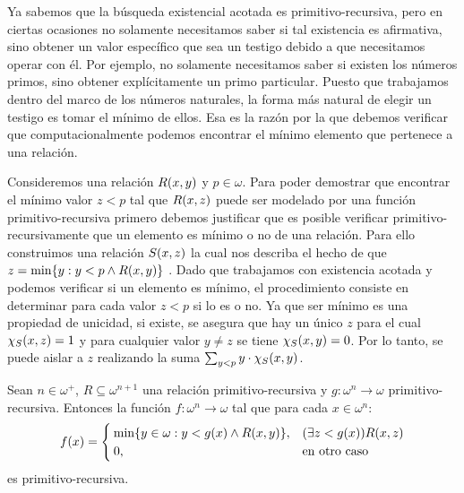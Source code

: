 Ya sabemos que la búsqueda existencial acotada es primitivo-recursiva, pero en ciertas ocasiones no solamente necesitamos saber si tal existencia es afirmativa, sino obtener un valor específico que sea un testigo debido a que necesitamos operar con él. Por ejemplo, no solamente necesitamos saber si existen los números primos, sino obtener explícitamente un primo particular. Puesto que trabajamos dentro del marco de los números naturales, la forma más natural de elegir un testigo es tomar el mínimo de ellos. Esa es la razón por la que debemos verificar que computacionalmente podemos encontrar el mínimo elemento que pertenece a una relación.

Consideremos una relación $R\pa*{x, y}$ y $p\in\omega$. Para poder demostrar que encontrar el mínimo valor $z < p$ tal que $R\pa*{x, z}$ puede ser modelado por una función primitivo-recursiva primero debemos justificar que es posible verificar primitivo-recursivamente que un elemento es mínimo o no de una relación. Para ello construimos una relación $S\pa*{x, z}$ la cual nos describa el hecho de que $z =\min\{y: y < p\land R\pa*{x, y}\}$ . Dado que trabajamos con existencia acotada y podemos verificar si un elemento es mínimo, el procedimiento consiste en determinar para cada valor $z < p$ si lo es o no. Ya que ser mínimo es una propiedad de unicidad, si existe, se asegura que hay un único $z$ para el cual $\chi_{S}\pa*{x, z} = 1$ y para cualquier valor $y\neq z$ se tiene $\chi_S\pa*{x, y} = 0$. Por lo tanto, se puede aislar a $z$ realizando la suma $\sum_{y < p}y\cdot\chi_S\pa*{x, y}$.

\begin{theorem}
	Sean $n\in\omega^{+}$, $R\subseteq\omega^{n + 1}$ una relación primitivo-recursiva y $g:\omega^{n}\to\omega$ primitivo-recursiva. Entonces la función $f:\omega^{n}\to\omega$ tal que para cada $x\in\omega^{n}$:
	\[
		f\pa*{x} =
		\begin{cases}
			\min\set{y\in\omega: y < g\pa*{x}\land R\pa*{x, y}}, &\pa*{\exists z < g\pa*{x}} R\pa*{x, z}\\
			0, &\text{en otro caso}
		\end{cases}
	\]
	es primitivo-recursiva.
\end{theorem}

